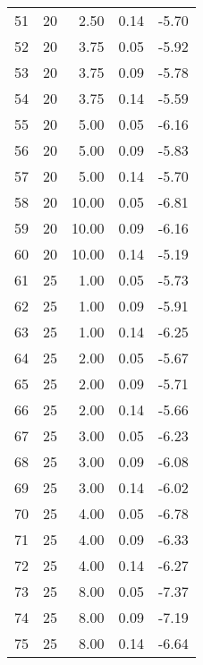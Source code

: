 \begin{tabular}{rrrrr}
    51 &        20 &   2.50 & 0.14 &                  -5.70 \\
    52 &        20 &   3.75 & 0.05 &                  -5.92 \\
    53 &        20 &   3.75 & 0.09 &                  -5.78 \\
    54 &        20 &   3.75 & 0.14 &                  -5.59 \\
    55 &        20 &   5.00 & 0.05 &                  -6.16 \\
    56 &        20 &   5.00 & 0.09 &                  -5.83 \\
    57 &        20 &   5.00 & 0.14 &                  -5.70 \\
    58 &        20 &  10.00 & 0.05 &                  -6.81 \\
    59 &        20 &  10.00 & 0.09 &                  -6.16 \\
    60 &        20 &  10.00 & 0.14 &                  -5.19 \\
    61 &        25 &   1.00 & 0.05 &                  -5.73 \\
    62 &        25 &   1.00 & 0.09 &                  -5.91 \\
    63 &        25 &   1.00 & 0.14 &                  -6.25 \\
    64 &        25 &   2.00 & 0.05 &                  -5.67 \\
    65 &        25 &   2.00 & 0.09 &                  -5.71 \\
    66 &        25 &   2.00 & 0.14 &                  -5.66 \\
    67 &        25 &   3.00 & 0.05 &                  -6.23 \\
    68 &        25 &   3.00 & 0.09 &                  -6.08 \\
    69 &        25 &   3.00 & 0.14 &                  -6.02 \\
    70 &        25 &   4.00 & 0.05 &                  -6.78 \\
    71 &        25 &   4.00 & 0.09 &                  -6.33 \\
    72 &        25 &   4.00 & 0.14 &                  -6.27 \\
    73 &        25 &   8.00 & 0.05 &                  -7.37 \\
    74 &        25 &   8.00 & 0.09 &                  -7.19 \\
    75 &        25 &   8.00 & 0.14 &                  -6.64 \\
\bottomrule
\end{tabular}
